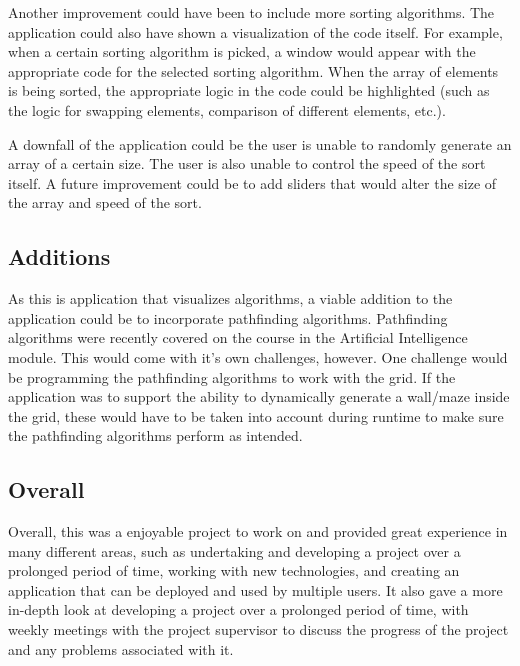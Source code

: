 Another improvement could have been to include more sorting algorithms. The application could also have shown a visualization of the code itself. For example, when a certain sorting algorithm is picked, a window would appear with the appropriate code for the selected sorting algorithm. When the array of elements is being sorted, the appropriate logic in the code could be highlighted (such as the logic for swapping elements, comparison of different elements, etc.).
\bigskip

A downfall of the application could be the user is unable to randomly generate an array of a certain size. The user is also unable to control the speed of the sort itself. A future improvement could be to add sliders that would alter the size of the array and speed of the sort.

\subsection{Additions}
As this is application that visualizes algorithms, a viable addition to the application could be to incorporate pathfinding algorithms. Pathfinding algorithms were recently covered on the course in the Artificial Intelligence module. This would come with it's own challenges, however. One challenge would be programming the pathfinding algorithms to work with the grid. If the application was to support the ability to dynamically generate a wall/maze inside the grid, these would have to be taken into account during runtime to make sure the pathfinding algorithms perform as intended. 

\subsection{Overall}
Overall, this was a enjoyable project to work on and provided great experience in many different areas, such as undertaking and developing a project over a prolonged period of time, working with new technologies, and creating an application that can be deployed and used by multiple users. It also gave a more in-depth look at developing a project over a prolonged period of time, with weekly meetings with the project supervisor to discuss the progress of the project and any problems associated with it.